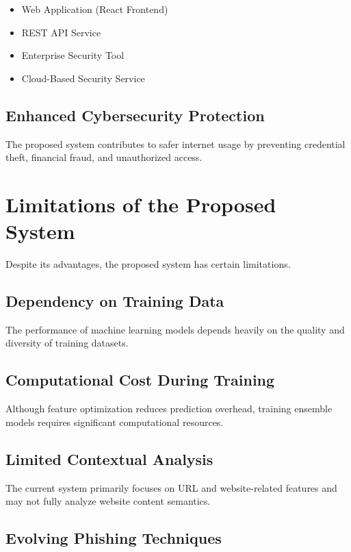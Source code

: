 \documentclass[12pt]{report}
\begin{document}
\begin{itemize}
    \item Web Application (React Frontend)
    \item REST API Service
    \item Enterprise Security Tool
    \item Cloud-Based Security Service
\end{itemize}

\subsection{Enhanced Cybersecurity Protection}

The proposed system contributes to safer internet usage by preventing credential theft, financial fraud, and unauthorized access.

\section{Limitations of the Proposed System}

Despite its advantages, the proposed system has certain limitations.

\subsection{Dependency on Training Data}

The performance of machine learning models depends heavily on the quality and diversity of training datasets.

\subsection{Computational Cost During Training}

Although feature optimization reduces prediction overhead, training ensemble models requires significant computational resources.

\subsection{Limited Contextual Analysis}

The current system primarily focuses on URL and website-related features and may not fully analyze website content semantics.

\subsection{Evolving Phishing Techniques}
\end{document}

